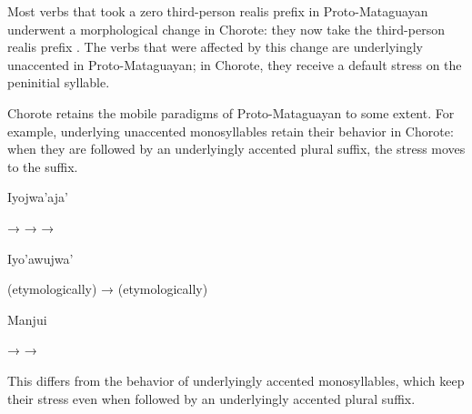 Most verbs that took a zero third-person realis prefix in Proto-Mataguayan underwent a morphological change in Chorote: they now take the third-person realis prefix . The verbs that were affected by this change are underlyingly unaccented in Proto-Mataguayan; in Chorote, they receive a default stress on the peninitial syllable.

\begin{exe}
    \ex \suckb
    \ex \swallow
    \ex \invite
    \ex \dig
    \ex \eatvt
    \ex \shoot
    \ex \carrysh
    \ex \walk
\end{exe}

Chorote retains the mobile paradigms of Proto-Mataguayan to some extent. For example, underlying unaccented monosyllables retain their behavior in Chorote: when they are followed by an underlyingly accented plural suffix, the stress moves to the suffix.

\ea
    Iyojwa’aja’ \citep[92]{JC14b}
    \begin{xlist}
        \ex {} → 
        \ex {} → 
        \ex {} → 
    \end{xlist}
\z
\newpage
\ea
    Iyo’awujwa’ \citep[176]{AG83}
    \begin{xlist}
        \ex {} (etymologically) →  (etymologically)
    \end{xlist}
\z
\ea
    Manjui \citep{JC18}
    \begin{xlist}
        \ex {} → 
        \ex {} → 
    \end{xlist}
\z

This differs from the behavior of underlyingly accented monosyllables, which keep their stress even when followed by an underlyingly accented plural suffix.

